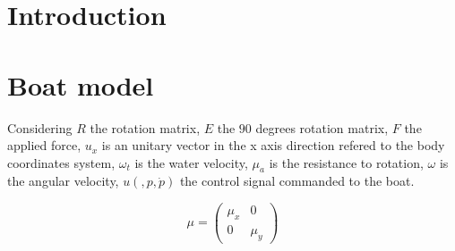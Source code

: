 \documentclass[conference]{IEEEtran}
\begin{document}
\title{}


\author{
\and
{}
}

\maketitle

\begin{abstract}

\end{abstract}

\begin{IEEEkeywords}

\end{IEEEkeywords}

\section{Introduction}

\section{Boat model}

Considering $R$ the rotation matrix, $E$ the  $90$ degrees rotation matrix, $F$ the applied force, $u_{x}$ is an unitary vector in the x axis direction refered to the body coordinates system, $\omega_{t}$ is the water velocity, $\mu_{a}$ is the resistance to rotation, $\omega$ is the angular velocity, $u(,p,\dot{p})$ the control signal commanded to the boat.

\begin{equation}
\mu=\begin{pmatrix}
\mu_{x} &0 \\ 0 &\mu_{y}
\end{pmatrix}
\end{equation}
\end{document}
